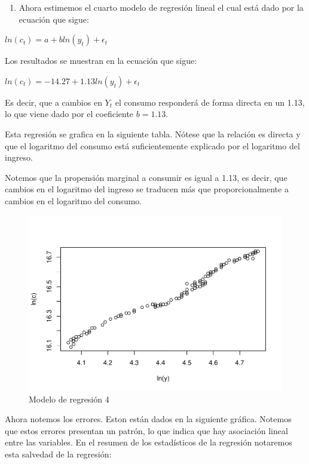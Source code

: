 \documentclass[
]{article}
\providecommand{\tightlist}{%
  \setlength{\itemsep}{0pt}\setlength{\parskip}{0pt}}
\begin{document}
\begin{enumerate}
\def\labelenumi{\arabic{enumi}.}
\setcounter{enumi}{3}
\tightlist
\item
  Ahora estimemos el cuarto modelo de regresión lineal el cual está dado
  por la ecuación que sigue:
\end{enumerate}

\(ln(c_t)=a+bln(y_t)+\epsilon_t\)

Los resultados se muestran en la ecuación que sigue:

\(ln(c_t)=-14.27+1.13ln(y_t)+\epsilon_t\)

Es decir, que a cambios en \(Y_t\) el consumo responderá de forma
directa en un 1.13, lo que viene dado por el coeficiente \(b=1.13\).

Esta regresión se grafica en la siguiente tabla. Nótese que la relación
es directa y que el logaritmo del consumo está suficientemente explicado
por el logaritmo del ingreso.

Notemos que la propensión marginal a consumir es igual a 1.13, es decir,
que cambios en el logaritmo del ingreso se traducen más que
proporcionalmente a cambios en el logaritmo del consumo.

\begin{figure}
\centering
\includegraphics{Ejercicio-3_files/figure-latex/unnamed-chunk-17-1.pdf}
\caption{Modelo de regresión 4}
\end{figure}

Ahora notemos los errores. Eston están dados en la siguiente gráfica.
Notemos que estos errores presentan un patrón, lo que indica que hay
asociación lineal entre las variables. En el resumen de los estadísticos
de la regresión notaremos esta salvedad de la regresión:
\end{document}
